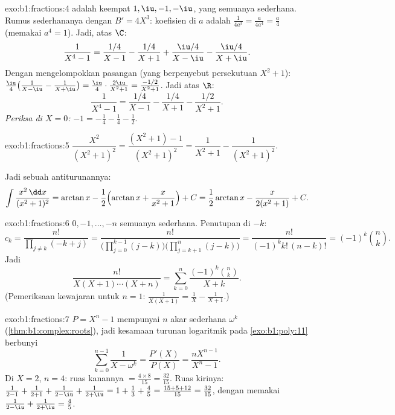 \begin{solution}{exo:b1:fractions:4}
 adalah  keempat $1, \iu, -1, -\iu$, yang semuanya
sederhana. Rumus  sederhananya dengan $B' = 4X^3$: koefisien di $a$ adalah
$\frac{1}{4a^3} = \frac{a}{4a^4} = \frac a4$ (memakai $a^4 = 1$). Jadi,
atas $\C$:
\[
\frac{1}{X^4 - 1}
= \frac{1/4}{X - 1} - \frac{1/4}{X + 1}
+ \frac{\iu/4}{X - \iu} - \frac{\iu/4}{X + \iu} .
\]
Dengan mengelompokkan pasangan  (yang berpenyebut persekutuan $X^2 + 1$):
$\frac{\iu}{4}\bigl(\frac{1}{X-\iu} - \frac{1}{X+\iu}\bigr) =
\frac{\iu}{4}\cdot\frac{2\iu}{X^2+1} = \frac{-1/2}{X^2+1}$. Jadi atas
$\R$:
\[
\frac{1}{X^4 - 1}
= \frac{1/4}{X-1} - \frac{1/4}{X+1} - \frac{1/2}{X^2 + 1} .
\]
\emph{Periksa di $X = 0$:} $-1 = -\frac14 - \frac14 - \frac12$.
\end{solution}

\begin{solution}{exo:b1:fractions:5}
$\dfrac{X^2}{(X^2+1)^2} = \dfrac{(X^2 + 1) - 1}{(X^2+1)^2} =
\dfrac{1}{X^2+1} - \dfrac{1}{(X^2+1)^2}$.

Jadi sebuah antiturunannya:
\[
\int \frac{x^2\,\dd x}{(x^2+1)^2}
= \arctan x - \frac12\Bigl(\arctan x + \frac{x}{x^2+1}\Bigr) + C
= \frac12\arctan x - \frac{x}{2(x^2+1)} + C .
\]
\end{solution}

\begin{solution}{exo:b1:fractions:6}
 $0, -1, \dots, -n$ semuanya sederhana. Penutupan di $-k$:
\[
c_k = \frac{n!}{\prod_{j \neq k} (-k + j)}
= \frac{n!}{\bigl(\prod_{j=0}^{k-1}(j - k)\bigr)
\bigl(\prod_{j=k+1}^{n}(j-k)\bigr)}
= \frac{n!}{(-1)^k k!\,(n-k)!} = (-1)^k \binom nk .
\]
Jadi
\[
\frac{n!}{X(X+1)\cdots(X+n)}
= \sum_{k=0}^{n} \frac{(-1)^k \binom nk}{X + k} .
\]
(Pemeriksaan kewajaran untuk $n = 1$: $\frac{1}{X(X+1)} = \frac1X -
\frac{1}{X+1}$.)
\end{solution}

\begin{solution}{exo:b1:fractions:7}
$P = X^n - 1$ mempunyai $n$ akar sederhana $\omega^k$
(\cref{thm:b1:complex:roots}), jadi kesamaan turunan logaritmik
pada \cref{exo:b1:poly:11} berbunyi
\[
\sum_{k=0}^{n-1} \frac{1}{X - \omega^k}
= \frac{P'(X)}{P(X)} = \frac{n X^{n-1}}{X^n - 1} .
\]
Di $X = 2$, $n = 4$: ruas kanannya $= \frac{4 \times 8}{15} =
\frac{32}{15}$. Ruas kirinya: $\frac{1}{2-1} + \frac{1}{2+1} +
\frac{1}{2 - \iu} + \frac{1}{2 + \iu} = 1 + \frac13 + \frac{4}{5} =
\frac{15 + 5 + 12}{15} = \frac{32}{15}$, dengan memakai $\frac{1}{2-\iu} +
\frac{1}{2+\iu} = \frac{4}{5}$.
\end{solution}


